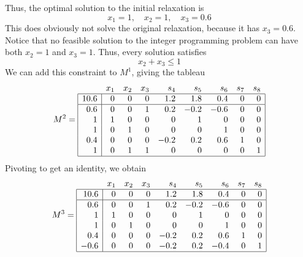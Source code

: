Thus, the optimal solution to the initial relaxation is
\begin{displaymath}
  x_1=1, \quad x_2=1, \quad x_3=0.6
\end{displaymath}
This does obviously not solve the original relaxation,
because it has $x_3=0.6$.
Notice that no feasible solution to the integer programming problem
can have both $x_2=1$ and $x_3=1$.
Thus, every solution satisfies
\begin{displaymath}
  x_2 + x_3 \leq 1
\end{displaymath}
We can add this constraint to $M^1$, giving the tableau
       \begin{displaymath}
         M^2 =
         \begin{array}{|r|rrrrrrrr|}
            \multicolumn{1}{c}{\quad} & x_1 & x_2 & x_3 & s_4 & s_5 & s_6 &
                s_7 & \multicolumn{1}{c}{s_8} \\ \hline
             10.6 & 0 & 0 & 0 & 1.2 & 1.8 & 0.4 & 0 & 0 \\ \hline
             0.6 & 0 & 0 & 1 & 0.2 & -0.2 & -0.6 & 0 & 0 \\
             1 & 1 & 0 & 0 & 0 & 1 & 0 & 0 & 0 \\
             1 & 0 & 1 & 0 & 0 & 0 & 1 & 0 & 0 \\
             0.4 & 0 & 0 & 0 & -0.2 & 0.2 & 0.6 & 1 & 0 \\
             1 & 0 & 1 & 1 & 0 & 0 & 0 & 0 & 1 \\ \hline
         \end{array}
       \end{displaymath}
Pivoting to get an identity, we obtain
       \begin{displaymath}
         M^3 =
         \begin{array}{|r|rrrrrrrr|}
            \multicolumn{1}{c}{\quad} & x_1 & x_2 & x_3 & s_4 & s_5 & s_6 &
                s_7 & \multicolumn{1}{c}{s_8} \\ \hline
             10.6 & 0 & 0 & 0 & 1.2 & 1.8 & 0.4 & 0 & 0 \\ \hline
             0.6 & 0 & 0 & 1 & 0.2 & -0.2 & -0.6 & 0 & 0 \\
             1 & 1 & 0 & 0 & 0 & 1 & 0 & 0 & 0 \\
             1 & 0 & 1 & 0 & 0 & 0 & 1 & 0 & 0 \\
             0.4 & 0 & 0 & 0 & -0.2 & 0.2 & 0.6 & 1 & 0 \\
             -0.6 & 0 & 0 & 0 & -0.2 & 0.2 & -0.4 & 0 & 1 \\ \hline
         \end{array}
       \end{displaymath}

